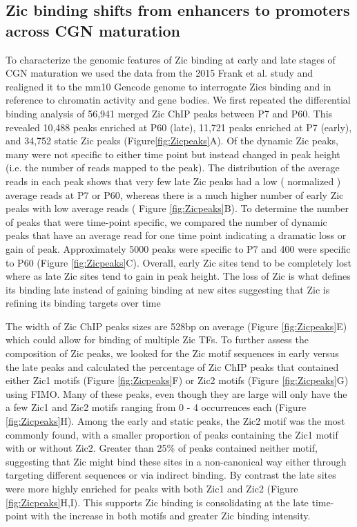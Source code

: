 \documentclass[fleqn,10pt]{wlscirep}
\begin{document}
\subsection*{Zic binding shifts from enhancers to promoters across CGN maturation} 

To characterize the genomic features of Zic binding at early and late stages of CGN maturation we used the data from the 2015 Frank et al. study \cite{Frank2015RegulationCerebellum} and realigned it to the mm10 Gencode genome to interrogate Zics binding and in reference to chromatin activity and gene bodies. We first repeated the differential binding analysis of 56,941 merged Zic ChIP peaks between P7 and P60. This revealed  10,488 peaks enriched at P60 (late), 11,721 peaks enriched at P7 (early), and 34,752 static Zic peaks (Figure\ref{fig:Zicpeaks}A).  Of the dynamic Zic peaks, many were not specific to either time point but instead changed in peak height (i.e. the number of reads mapped to the peak). The distribution of the average reads in each peak shows  that very few late Zic peaks had a low ( normalized ) average reads at P7 or P60, whereas there is a much higher number of early Zic peaks with low average reads ( Figure \ref{fig:Zicpeaks}B). To determine the number of peaks that were time-point specific, we compared the number of dynamic peaks that have an average read  for one time point  indicating a dramatic loss or gain of peak. Approximately 5000 peaks were specific to P7 and 400 were specific to P60 (Figure \ref{fig:Zicpeaks}C). Overall, early Zic sites tend to be completely lost where as late Zic sites tend to gain in peak height. The loss of Zic is what defines its binding late instead of gaining binding at new sites suggesting that Zic is refining its binding targets over time

The width of Zic ChIP peaks sizes are 528bp on average (Figure \ref{fig:Zicpeaks}E) which could allow for binding of multiple Zic TFs. To further assess the composition of Zic peaks, we looked for the Zic motif sequences in early versus the late peaks and calculated the percentage of Zic ChIP peaks that contained either Zic1 motifs (Figure \ref{fig:Zicpeaks}F) or Zic2 motifs (Figure \ref{fig:Zicpeaks}G) using FIMO.  
Many of these peaks, even though they are large will only have the a few Zic1 and Zic2 motifs ranging from 0 - 4 occurrences each (Figure \ref{fig:Zicpeaks}H). Among the early and static peaks, the Zic2 motif was the most commonly found, with a smaller proportion of peaks containing the Zic1 motif with or without Zic2. Greater than 25\% of peaks contained neither motif, suggesting that Zic might bind these sites in a non-canonical way either through targeting different sequences or via indirect binding. By contrast the late sites were more highly enriched for peaks with both Zic1 and Zic2 (Figure \ref{fig:Zicpeaks}H,I). This supports Zic binding is consolidating at the late time-point with the increase in both motifs and greater Zic binding intensity.
\end{document}
